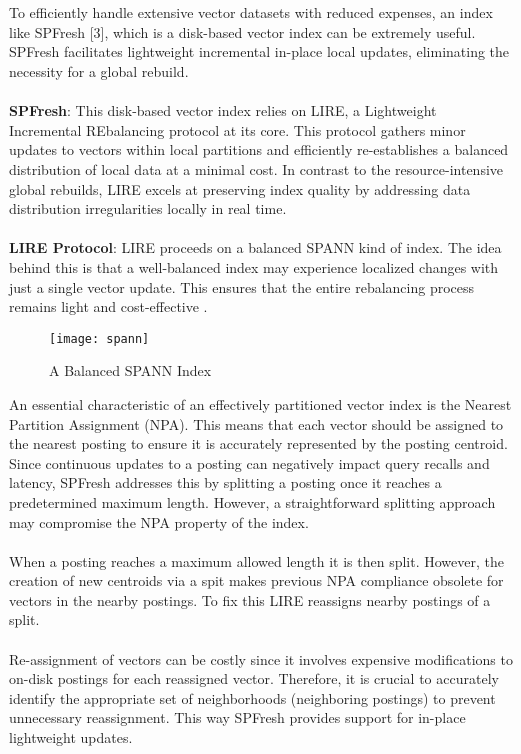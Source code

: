 \documentclass[conference]{IEEEtran}
\begin{document}
\\
\\
To efficiently handle extensive vector datasets with reduced expenses, an index like SPFresh [3], which is a disk-based vector index can be extremely useful. SPFresh facilitates lightweight incremental in-place local updates, eliminating the necessity for a global rebuild.
\\
\\
\textbf{SPFresh}:
This disk-based vector index relies on LIRE, a Lightweight Incremental REbalancing protocol at its core. This protocol gathers minor updates to vectors within local partitions and efficiently re-establishes a balanced distribution of local data at a minimal cost. In contrast to the resource-intensive global rebuilds, LIRE excels at preserving index quality by addressing data distribution irregularities locally in real time.
\\
\\
\textbf{LIRE Protocol}:
LIRE proceeds on a balanced SPANN kind of index. The idea behind this is that a well-balanced index may experience localized changes with just a single vector update. This ensures that the entire rebalancing process remains light and cost-effective \cite{r5,r6}.
\begin{figure}[h!]
  \centering
  \texttt{[image: spann]}
  \caption{A Balanced SPANN Index}
  \label{fig: A Balanced SPANN Index}
\end{figure}

An essential characteristic of an effectively partitioned vector index is the Nearest Partition Assignment (NPA). This means that each vector should be assigned to the nearest posting to ensure it is accurately represented by the posting centroid. Since continuous updates to a posting can negatively impact query recalls and latency, SPFresh addresses this by splitting a posting once it reaches a predetermined maximum length. However, a straightforward splitting approach may compromise the NPA property of the index.
\\
\\
When a posting reaches a maximum allowed length it is then split. However, the creation of new centroids via a spit makes previous NPA compliance obsolete for vectors in the nearby postings. To fix this LIRE reassigns nearby postings of a split.
\\
\\
Re-assignment of vectors can be costly since it involves expensive modifications to on-disk postings for each reassigned vector. Therefore, it is crucial to accurately identify the appropriate set of neighborhoods (neighboring postings) to prevent unnecessary reassignment. This way SPFresh provides support for in-place lightweight updates.
\end{document}
